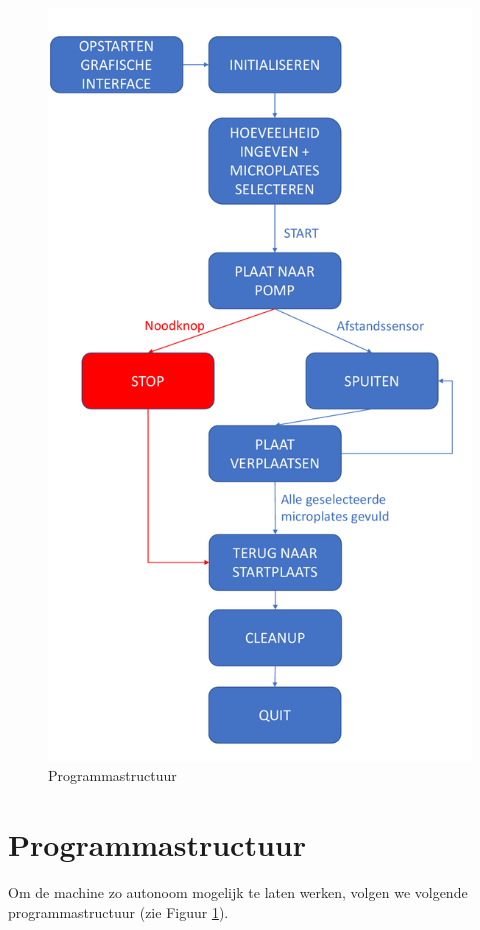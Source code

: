 \documentclass[a4paper,twoside,kulak]{kulakreport} %
\begin{document}
\begin{figure}[h]
	\centering
	\includegraphics[width=1\textwidth]{Programmastructuur.pdf}
	\caption{Programmastructuur}
	\label{fig: Programmastrucuur}
	
\end{figure} 

\section{Programmastructuur}
Om de machine zo autonoom mogelijk te laten werken, volgen we volgende programmastructuur (zie Figuur \ref{fig: Programmastrucuur}). 
\end{document}
